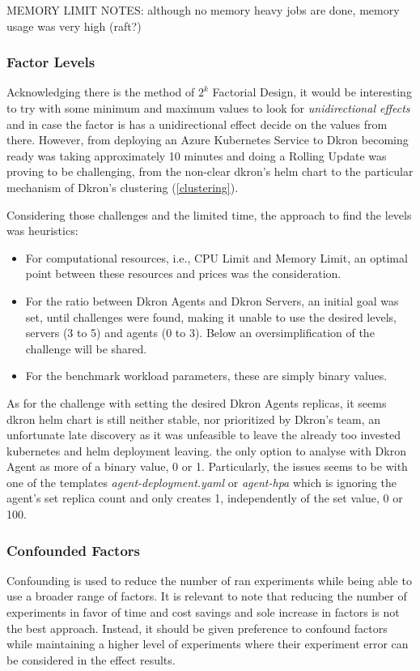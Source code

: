 \documentclass[runningheads]{llncs}
\begin{document}
MEMORY LIMIT NOTES: although no memory heavy jobs are done, memory usage was very high (raft?)



\subsubsection{Factor Levels}
Acknowledging there is the method of $2^k$ Factorial Design, it would be interesting to
try with some minimum and maximum values to look for \textit{unidirectional effects} and
in case the factor is has a unidirectional effect decide on the values from there. However,
from deploying an Azure Kubernetes Service to Dkron becoming ready was taking approximately
10 minutes and doing a Rolling Update was proving to be challenging, from the non-clear dkron's
helm chart to the particular mechanism of Dkron's clustering (\ref{clustering}).

Considering those challenges and the limited time, the approach to find the levels was heuristics:
\begin{itemize}
    \item For computational resources, i.e., CPU Limit and Memory Limit, an optimal point between
    these resources and prices was the consideration.
    \item For the ratio between Dkron Agents and Dkron Servers, an initial goal was set, until
    challenges were found, making it unable to use the desired levels, servers (3 to 5) and agents (0 to 3).
    Below an oversimplification of the challenge will be shared.
    \item For the benchmark workload parameters, these are simply binary values.
\end{itemize}

As for the challenge with setting the desired Dkron Agents replicas, it seems dkron helm chart
is still neither stable, nor prioritized by Dkron's team, an unfortunate late discovery
as it was unfeasible to leave the already too invested kubernetes and helm deployment leaving.
the only option to analyse with Dkron Agent as more of a binary value, 0 or 1.
Particularly, the issues seems to be with one of the templates \textit{agent-deployment.yaml} or
\textit{agent-hpa} which is ignoring the agent's set replica count and only creates 1,
independently of the set value, 0 or 100.



\subsubsection{Confounded Factors}
Confounding is used to reduce the number of ran experiments while being able to use a broader range
of factors. It is relevant to note that reducing the number of experiments in favor of time and cost savings
and sole increase in factors is not the best approach. Instead, it should be given preference to confound
factors while maintaining a higher level of experiments where their experiment error can be considered
in the effect results.
\end{document}
